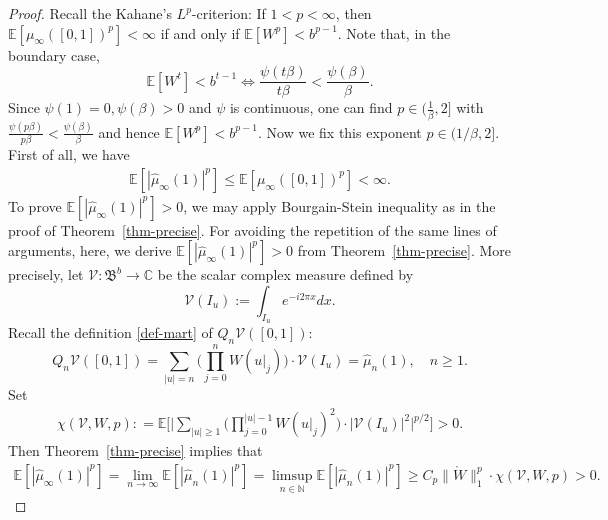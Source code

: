 \documentclass[12pt]{amsart}
\theoremstyle{definition}
\theoremstyle{remark}
\newcommand{\N}{\mathbb{N}}
\newcommand{\C}{\mathbb{C}}
\newcommand{\E}{\mathbb{E}}
\numberwithin{equation}{section}
\begin{document}
\begin{proof}
Recall the Kahane's $L^p$-criterion: If $1<p<\infty$, then  $\E[\mu_\infty([0,1])^p]<\infty$ if and only if $\E[W^p]<b^{p-1}$. Note that, in the boundary case,  
\[
\E[W^t]<b^{t-1} \Longleftrightarrow \frac{\psi(t \beta)}{t\beta} < \frac{\psi(\beta)}{\beta}. 
\]
Since $\psi(1)= 0, \psi(\beta)> 0$ and  $\psi$ is continuous,  one can find $p\in (\frac{1}{\beta}, 2]$ with
$
\frac{\psi(p \beta)}{p\beta} < \frac{\psi(\beta)}{\beta}
$
and hence 
$
\E[W^p]<b^{p-1}. 
$
Now we fix this exponent $p\in (1/\beta, 2]$.  First of all, we have 
\begin{align}\label{eqn-finite-p-moment}
\E[|\widehat{\mu}_\infty(1)|^p]  \le \E[\mu_\infty ([0,1])^p ]<\infty.
\end{align}
To prove $\E[|\widehat{\mu}_\infty(1)|^p]> 0$, we may apply Bourgain-Stein inequality as in the proof of Theorem~\ref{thm-precise}.   For avoiding the repetition of the same lines of arguments, here,  we derive $\E[|\widehat{\mu}_\infty(1)|^p]> 0$ from  Theorem~\ref{thm-precise}. More precisely,  let $\mathcal{V}: \mathfrak{B}^b \rightarrow \C$ be the scalar complex measure defined by 
\[
\mathcal{V}(I_u):=\int_{I_u} e^{-i 2\pi x}dx. 
\]
Recall the definition   \eqref{def-mart} of $Q_n\mathcal{V}([0,1])$: 
\[
Q_n\mathcal{V} ([0,1]) = \sum_{|u|=n}  \Big(\prod_{j=0}^n W(u|_j)\Big) \cdot \mathcal{V}(I_u)=\widehat{\mu}_n(1), \quad n\ge 1. 
\] 
Set
\begin{align*}
\chi(\mathcal{V}, W, p): =   \E\Big[ \Big| \sum_{|u|\ge 1}    \Big(  \prod_{j=0}^{|u|-1} W(u|_j)^2 \Big)   \cdot  \big| \mathcal{V}(I_u)  \big|^2       \Big|^{p/2} \Big]>0.
\end{align*}
Then Theorem~\ref{thm-precise} implies that 
\begin{align*}
\E[|\widehat{\mu}_\infty(1)|^p]=\lim_{n \rightarrow\infty}\E[|\widehat{\mu}_n(1)|^p] =\limsup_{n\in \N}\E[|\widehat{\mu}_n(1)|^p] \geq C_p   \|\mathring{W}\|_1^p\cdot    \chi(\mathcal{V}, W, p)>0.   
\end{align*} 





\end{proof}
\end{document}
